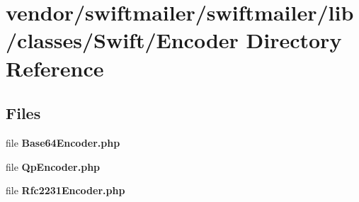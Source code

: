 \section{vendor/swiftmailer/swiftmailer/lib/classes/\+Swift/\+Encoder Directory Reference}
\label{dir_4898c1f8412cfa81611c1606bb7df45c}
\subsection*{Files}
\begin{DoxyCompactItemize}
\item 
file {\bf Base64\+Encoder.\+php}
\item 
file {\bf Qp\+Encoder.\+php}
\item 
file {\bf Rfc2231\+Encoder.\+php}
\end{DoxyCompactItemize}
